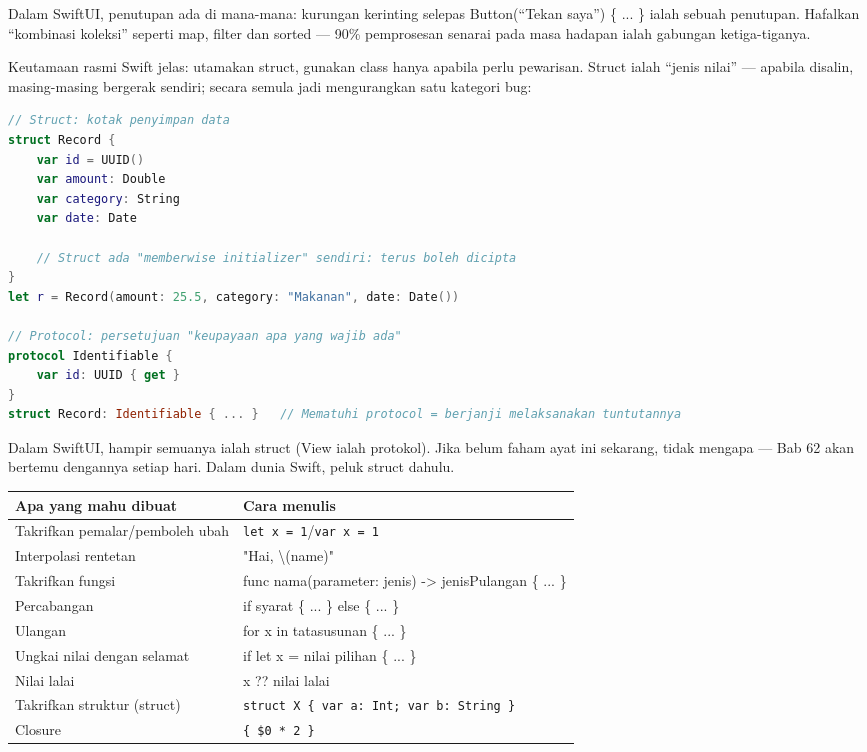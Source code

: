 Dalam SwiftUI, penutupan ada di mana-mana: kurungan kerinting selepas Button(“Tekan saya”) \{ ... \} ialah sebuah penutupan. Hafalkan “kombinasi koleksi” seperti map, filter dan sorted — 90\% pemprosesan senarai pada masa hadapan ialah gabungan ketiga-tiganya.


Keutamaan rasmi Swift jelas: utamakan struct, gunakan class hanya apabila perlu pewarisan. Struct ialah “jenis nilai” — apabila disalin, masing-masing bergerak sendiri; secara semula jadi mengurangkan satu kategori bug:

\begin{lstlisting}[language=Swift]
// Struct: kotak penyimpan data
struct Record {
    var id = UUID()
    var amount: Double
    var category: String
    var date: Date

    // Struct ada "memberwise initializer" sendiri: terus boleh dicipta
}
let r = Record(amount: 25.5, category: "Makanan", date: Date())

// Protocol: persetujuan "keupayaan apa yang wajib ada"
protocol Identifiable {
    var id: UUID { get }
}
struct Record: Identifiable { ... }   // Mematuhi protocol = berjanji melaksanakan tuntutannya
\end{lstlisting}

Dalam SwiftUI, hampir semuanya ialah struct (View ialah protokol). Jika belum faham ayat ini sekarang, tidak mengapa — Bab 62 akan bertemu dengannya setiap hari. Dalam dunia Swift, peluk struct dahulu.


\begin{center}
\begin{tabularx}{\linewidth}{|X|X|}
\hline
\textbf{Apa yang mahu dibuat} & \textbf{Cara menulis} \tabularnewline
\hline
Takrifkan pemalar/pemboleh ubah & \texttt{let x = 1}/\texttt{var x = 1} \tabularnewline
Interpolasi rentetan & "Hai, \textbackslash{}(name)" \tabularnewline
Takrifkan fungsi & func nama(parameter: jenis) -> jenisPulangan \{ ... \} \tabularnewline
Percabangan & if syarat \{ ... \} else \{ ... \} \tabularnewline
Ulangan & for x in tatasusunan \{ ... \} \tabularnewline
Ungkai nilai dengan selamat & if let x = nilai pilihan \{ ... \} \tabularnewline
Nilai lalai & x ?? nilai lalai \tabularnewline
Takrifkan struktur (struct) & \texttt{struct X \{ var a: Int; var b: String \}} \tabularnewline
Closure & \texttt{\{ \$0 * 2 \}} \tabularnewline
\hline
\end{tabularx}
\end{center}

